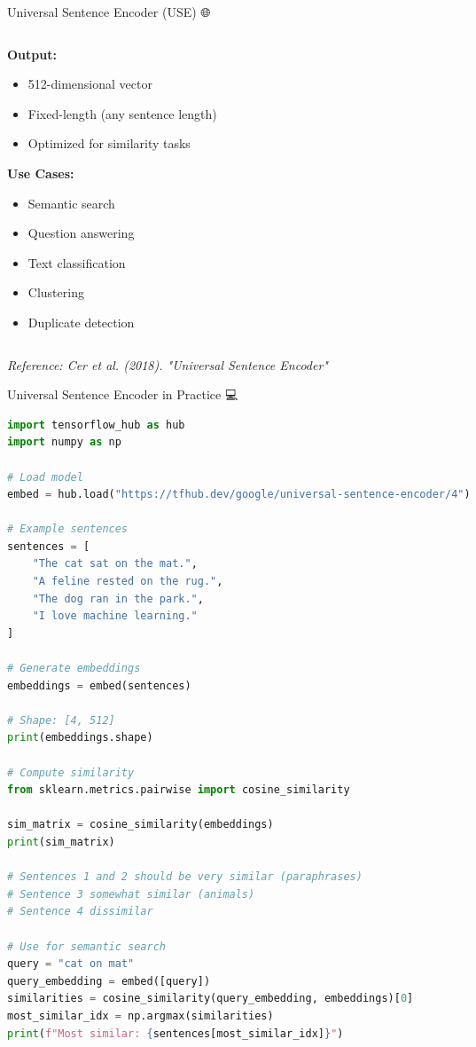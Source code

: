 \documentclass[aspectratio=169]{beamer}
\begin{document}
\begin{frame}[shrink=10]{Universal Sentence Encoder (USE) 🌐}
\begin{columns}[T]
\begin{column}{0.48\textwidth}
\vspace{0.5em}
\textbf{Output:}
\begin{itemize}\setlength{\itemsep}{0pt}
    \item 512-dimensional vector
    \item Fixed-length (any sentence length)
    \item Optimized for similarity tasks
\end{itemize}

\vspace{0.5em}
\textbf{Use Cases:}
\begin{itemize}\setlength{\itemsep}{0pt}
    \item Semantic search
    \item Question answering
    \item Text classification
    \item Clustering
    \item Duplicate detection
\end{itemize}
\end{column}
\end{columns}

\vspace{0.5em}
\small
\textit{Reference: Cer et al. (2018). "Universal Sentence Encoder"}
\end{frame}

\begin{frame}[fragile]{Universal Sentence Encoder in Practice 💻}
\begin{lstlisting}[language=Python]
import tensorflow_hub as hub
import numpy as np

# Load model
embed = hub.load("https://tfhub.dev/google/universal-sentence-encoder/4")

# Example sentences
sentences = [
    "The cat sat on the mat.",
    "A feline rested on the rug.",
    "The dog ran in the park.",
    "I love machine learning."
]

# Generate embeddings
embeddings = embed(sentences)

# Shape: [4, 512]
print(embeddings.shape)

# Compute similarity
from sklearn.metrics.pairwise import cosine_similarity

sim_matrix = cosine_similarity(embeddings)
print(sim_matrix)

# Sentences 1 and 2 should be very similar (paraphrases)
# Sentence 3 somewhat similar (animals)
# Sentence 4 dissimilar

# Use for semantic search
query = "cat on mat"
query_embedding = embed([query])
similarities = cosine_similarity(query_embedding, embeddings)[0]
most_similar_idx = np.argmax(similarities)
print(f"Most similar: {sentences[most_similar_idx]}")
\end{lstlisting}
\end{frame}
\end{document}
